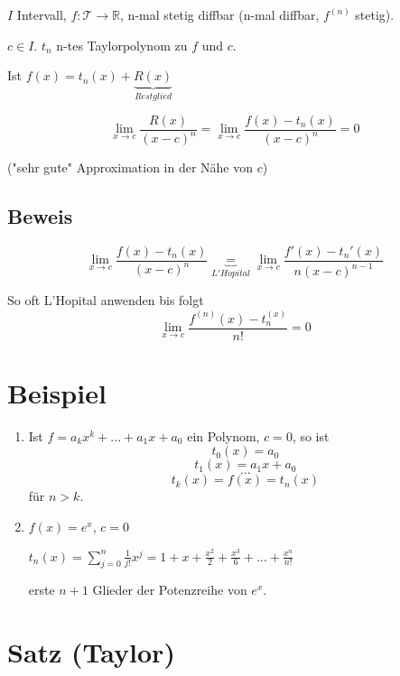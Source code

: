 \documentclass[a4paper, openany]{book}
\begin{document}
         $I$ Intervall, $f: \mathcal{T} \rightarrow \mathbb{R}$, n-mal stetig diffbar (n-mal diffbar, $f^{(n)}$ stetig).

         \par \medskip

         $c \in I$. $t_n$ n-tes Taylorpolynom zu $f$ und $c$.

         \par \medskip

         Ist $f(x) = t_n(x) + \underbrace{R(x)}_{Restglied}$

         \[ \lim_{x \rightarrow c} \frac{R(x)}{(x-c)^n} = \lim_{x \rightarrow c} \frac{f(x) - t_n(x)}{(x-c)^n} = 0\]

         ("sehr gute" Approximation in der Nähe von $c$)

         \subsection{Beweis}

         \[ \lim_{x \rightarrow c} \frac{f(x) - t_n(x)}{(x-c)^n} \underbrace{=}_{L'Hopital} \lim_{x \rightarrow c} \frac{f'(x) - t_n'(x)}{n(x-c)^{n-1}}\]

         So oft L'Hopital anwenden bis folgt \[ \lim_{x \rightarrow c} \frac{f^{(n)}(x) - t_n^{(x)}}{n!} = 0 \]

         \section{Beispiel}

         \begin{enumerate}[label=(\alph*)]
          \item Ist $f = a_kx^k + ... + a_1x + a_0$ ein Polynom, $c = 0$, so ist \[t_0(x) = a_0 \] \[t_1(x) = a_1x+a_0 \] \[...\] \[ t_k(x) = f(x) = t_n(x) \] für $n > k$.

          \item $f(x) = e^x$, $c = 0$

          \par \medskip

          $t_n(x) = \sum_{j=0}^n \frac{1}{j!} x^j = 1 + x + \frac{x^2}{2} + \frac{x^3}{6} + ... + \frac{x^n}{n!}$

          erste $n+1$ Glieder der Potenzreihe von $e^x$.
        \end{enumerate}

        \section{Satz (Taylor)}
\end{document}
